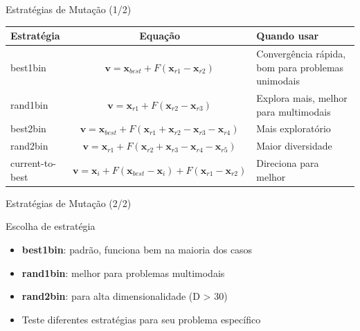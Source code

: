 \begin{frame}{Estratégias de Mutação (1/2)}
\begin{center}
\scriptsize
\begin{tabular}{lcp{4.5cm}}
\toprule
\textbf{Estratégia} & \textbf{Equação} & \textbf{Quando usar} \\
\midrule
best1bin & $\mathbf{v} = \mathbf{x}_{best} + F(\mathbf{x}_{r1} - \mathbf{x}_{r2})$ & Convergência rápida, bom para problemas unimodais \\
rand1bin & $\mathbf{v} = \mathbf{x}_{r1} + F(\mathbf{x}_{r2} - \mathbf{x}_{r3})$ & Explora mais, melhor para multimodais \\
best2bin & $\mathbf{v} = \mathbf{x}_{best} + F(\mathbf{x}_{r1} + \mathbf{x}_{r2} - \mathbf{x}_{r3} - \mathbf{x}_{r4})$ & Mais exploratório \\
rand2bin & $\mathbf{v} = \mathbf{x}_{r1} + F(\mathbf{x}_{r2} + \mathbf{x}_{r3} - \mathbf{x}_{r4} - \mathbf{x}_{r5})$ & Maior diversidade \\
current-to-best & $\mathbf{v} = \mathbf{x}_i + F(\mathbf{x}_{best} - \mathbf{x}_i) + F(\mathbf{x}_{r1} - \mathbf{x}_{r2})$ & Direciona para melhor \\
\bottomrule
\end{tabular}
\end{center}
\end{frame}

\begin{frame}{Estratégias de Mutação (2/2)}
\begin{block}{Escolha de estratégia}
\begin{itemize}
    \item \textbf{best1bin}: padrão, funciona bem na maioria dos casos
    \item \textbf{rand1bin}: melhor para problemas multimodais
    \item \textbf{rand2bin}: para alta dimensionalidade (D > 30)
    \item Teste diferentes estratégias para seu problema específico
\end{itemize}
\end{block}
\end{frame}

